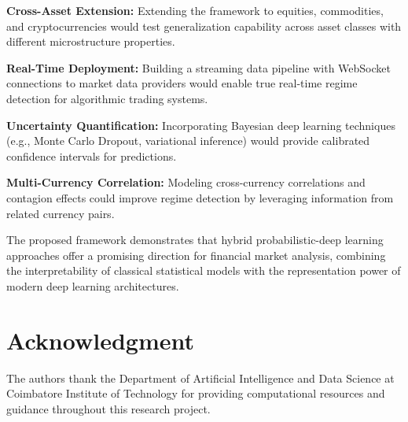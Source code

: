 \documentclass[conference]{IEEEtran}
\begin{document}
\textbf{Cross-Asset Extension:} Extending the framework to equities, commodities, and cryptocurrencies would test generalization capability across asset classes with different microstructure properties.

\textbf{Real-Time Deployment:} Building a streaming data pipeline with WebSocket connections to market data providers would enable true real-time regime detection for algorithmic trading systems.

\textbf{Uncertainty Quantification:} Incorporating Bayesian deep learning techniques (e.g., Monte Carlo Dropout, variational inference) would provide calibrated confidence intervals for predictions.

\textbf{Multi-Currency Correlation:} Modeling cross-currency correlations and contagion effects could improve regime detection by leveraging information from related currency pairs.

The proposed framework demonstrates that hybrid probabilistic-deep learning approaches offer a promising direction for financial market analysis, combining the interpretability of classical statistical models with the representation power of modern deep learning architectures.

\section*{Acknowledgment}
The authors thank the Department of Artificial Intelligence and Data Science at Coimbatore Institute of Technology for providing computational resources and guidance throughout this research project.
\end{document}
